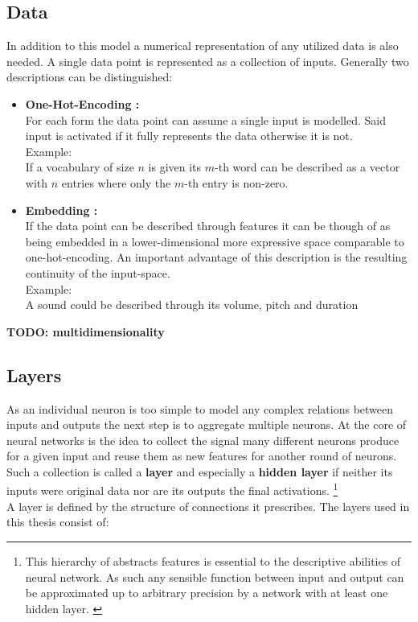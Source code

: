 \subsection{Data}
In addition to this model a numerical representation of any utilized data is also needed. A single data point is represented as a collection of inputs. Generally two descriptions can be distinguished:
\begin{itemize}
	\item \textbf{One-Hot-Encoding :}\\
	For each form the data point can assume a single input is modelled. Said input is activated if it fully represents the data otherwise it is not.\\
	Example:\\
	If a vocabulary of size $n$ is given its $m$-th word can be described as a vector with $n$ entries where only the $m$-th entry is non-zero.
	\item \textbf{Embedding :}\\
	If the data point can be described through features it can be though of as being embedded in a lower-dimensional more expressive space comparable to one-hot-encoding. An important advantage of this description is the resulting continuity of the input-space.\\
	Example: \\
	A sound could be described through its volume, pitch and duration
\end{itemize} 

\textbf{TODO: multidimensionality}

\subsection{Layers}
As an individual neuron is too simple to model any complex relations between inputs and outputs the next step is to aggregate multiple neurons. At the core of neural networks is the idea to collect the signal many different neurons produce for a given input and reuse them as new features for another round of neurons. Such a collection is called a \textbf{layer} and especially a \textbf{hidden layer} if neither its inputs were original data nor are its outputs the final activations. \footnote{
	This hierarchy of abstracts features is essential to the descriptive abilities of neural network. As such any sensible function between input and output can be approximated up to arbitrary precision by a network with at least one hidden layer. \cite{universal}
	}\\
A layer is defined by the structure of connections it prescribes. The layers used in this thesis consist of:

